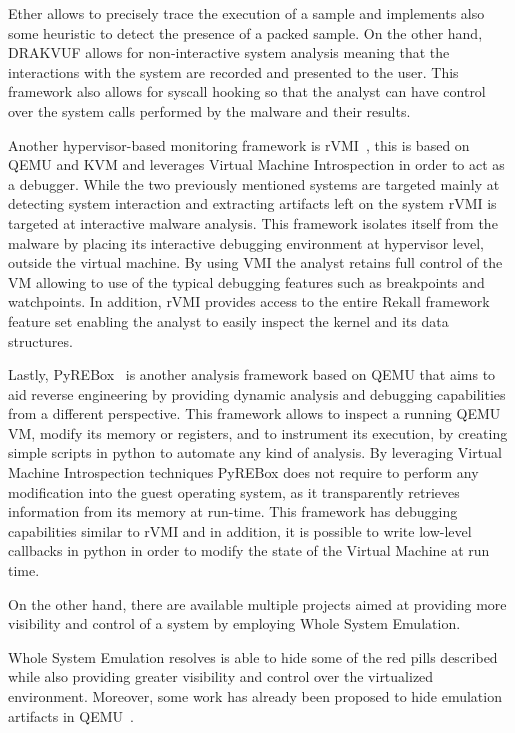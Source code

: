 Ether allows to precisely trace the execution of a sample and implements also some heuristic to detect the presence of a packed sample. On the other hand, DRAKVUF allows for non-interactive system analysis meaning that the interactions with the system are recorded and presented to the user. This framework also allows for syscall hooking so that the analyst can have control over the system calls performed by the malware and their results. 

Another hypervisor-based monitoring framework is rVMI~\cite{rvmi}, this is based on QEMU and KVM and leverages Virtual Machine Introspection in order to act as a debugger. While the two previously mentioned systems are targeted mainly at detecting system interaction and extracting artifacts left on the system rVMI is targeted at interactive malware analysis. This framework isolates itself from the malware by placing its interactive debugging environment at hypervisor level, outside the virtual machine. By using VMI the analyst retains full control of the VM allowing to use of the typical debugging features such as breakpoints and watchpoints. In addition, rVMI provides access to the entire Rekall framework feature set enabling the analyst to easily inspect the kernel and its data structures.

Lastly, PyREBox~\cite{pyrebox} is another analysis framework based on QEMU that aims to aid reverse engineering by providing dynamic analysis and debugging capabilities from a different perspective. This framework allows to inspect a running QEMU VM, modify its memory or registers, and to instrument its execution, by creating simple scripts in python to automate any kind of analysis. By leveraging Virtual Machine Introspection techniques PyREBox does not require to perform any modification into the guest operating system, as it transparently retrieves information from its memory at run-time. This framework has debugging capabilities similar to rVMI and in addition, it is possible to write low-level callbacks in python in order to modify the state of the Virtual Machine at run time. 

On the other hand, there are available multiple projects aimed at providing more visibility and control of a system by employing Whole System Emulation. 

Whole System Emulation resolves is able to hide some of the red pills described while also providing greater visibility and control over the virtualized environment. Moreover, some work has already been proposed to hide emulation artifacts in QEMU~\cite{Kang2009EmulatingEM}.


